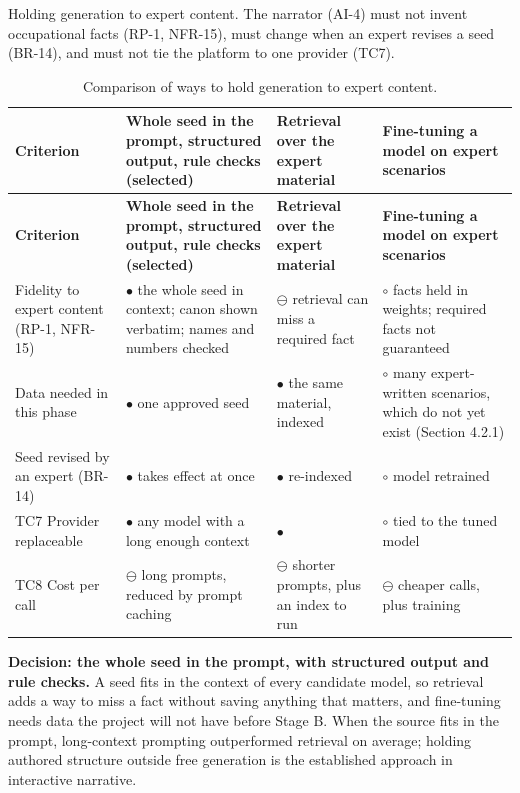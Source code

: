 Holding generation to expert content. The narrator (AI-4) must not invent occupational facts (RP-1, NFR-15), must change when an expert revises a seed (BR-14), and must not tie the platform to one provider (TC7).

{\small
\begin{longtable}{|>{\raggedright\arraybackslash}p{}|>{\raggedright\arraybackslash}p{}|>{\raggedright\arraybackslash}p{}|>{\raggedright\arraybackslash}p{}|}
\caption{Comparison of ways to hold generation to expert content.} \\
\hline
\textbf{Criterion} & \textbf{Whole seed in the prompt, structured output, rule checks (selected)} & \textbf{Retrieval over the expert material} & \textbf{Fine-tuning a model on expert scenarios} \\ \hline
\endfirsthead
\hline
\textbf{Criterion} & \textbf{Whole seed in the prompt, structured output, rule checks (selected)} & \textbf{Retrieval over the expert material} & \textbf{Fine-tuning a model on expert scenarios} \\ \hline
\endhead
Fidelity to expert content (RP-1, NFR-15) & $\bullet$ the whole seed in context; canon shown verbatim; names and numbers checked\cite{r120,r121} & $\ominus$ retrieval can miss a required fact & $\circ$ facts held in weights; required facts not guaranteed \\ \hline
Data needed in this phase & $\bullet$ one approved seed & $\bullet$ the same material, indexed & $\circ$ many expert-written scenarios, which do not yet exist (Section 4.2.1) \\ \hline
Seed revised by an expert (BR-14) & $\bullet$ takes effect at once & $\bullet$ re-indexed & $\circ$ model retrained \\ \hline
TC7 Provider replaceable & $\bullet$ any model with a long enough context & $\bullet$ & $\circ$ tied to the tuned model \\ \hline
TC8 Cost per call & $\ominus$ long prompts, reduced by prompt caching & $\ominus$ shorter prompts, plus an index to run & $\ominus$ cheaper calls, plus training \\ \hline
\end{longtable}
}

\textbf{Decision: the whole seed in the prompt, with structured output and rule checks.} A seed fits in the context of every candidate model, so retrieval adds a way to miss a fact without saving anything that matters, and fine-tuning needs data the project will not have before Stage B. When the source fits in the prompt, long-context prompting outperformed retrieval on average\cite{r121}; holding authored structure outside free generation is the established approach in interactive narrative\cite{r120}.

